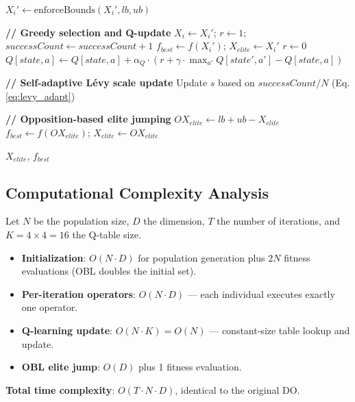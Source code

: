 \documentclass[preprint,12pt]{elsarticle}
\begin{document}
\begin{algorithm}[htbp]
\begin{algorithmic}[1]
        \STATE $X_i' \leftarrow \text{enforceBounds}(X_i', lb, ub)$
        
        \STATE \textbf{// Greedy selection and Q-update}
            \STATE $X_i \leftarrow X_i'$; $r \leftarrow 1$; $successCount \leftarrow successCount + 1$
                \STATE $f_{best} \leftarrow f(X_i')$; $X_{elite} \leftarrow X_i'$
            \ENDIF
        \ELSE
            \STATE $r \leftarrow 0$
        \ENDIF
        \STATE $Q[state, a] \leftarrow Q[state, a] + \alpha_Q \cdot (r + \gamma \cdot \max_{a'} Q[state', a'] - Q[state, a])$
    \ENDFOR
    
    \STATE \textbf{// Self-adaptive Lévy scale update}
    \STATE Update $s$ based on $successCount / N$ (Eq. \ref{eq:levy_adapt})
    
    \STATE \textbf{// Opposition-based elite jumping}
        \STATE $OX_{elite} \leftarrow lb + ub - X_{elite}$
            \STATE $f_{best} \leftarrow f(OX_{elite})$; $X_{elite} \leftarrow OX_{elite}$
        \ENDIF
    \ENDIF
\ENDFOR

\RETURN $X_{elite}$, $f_{best}$
\end{algorithmic}
\end{algorithm}

\subsection{Computational Complexity Analysis}
\label{subsec:complexity}

Let $N$ be the population size, $D$ the dimension, $T$ the number of iterations, and $K = 4 \times 4 = 16$ the Q-table size.

\begin{itemize}
    \item \textbf{Initialization}: $O(N \cdot D)$ for population generation plus $2N$ fitness evaluations (OBL doubles the initial set).
    \item \textbf{Per-iteration operators}: $O(N \cdot D)$ — each individual executes exactly one operator.
    \item \textbf{Q-learning update}: $O(N \cdot K) = O(N)$ — constant-size table lookup and update.
    \item \textbf{OBL elite jump}: $O(D)$ plus 1 fitness evaluation.
\end{itemize}

\textbf{Total time complexity}: $O(T \cdot N \cdot D)$, identical to the original DO.
\end{document}

